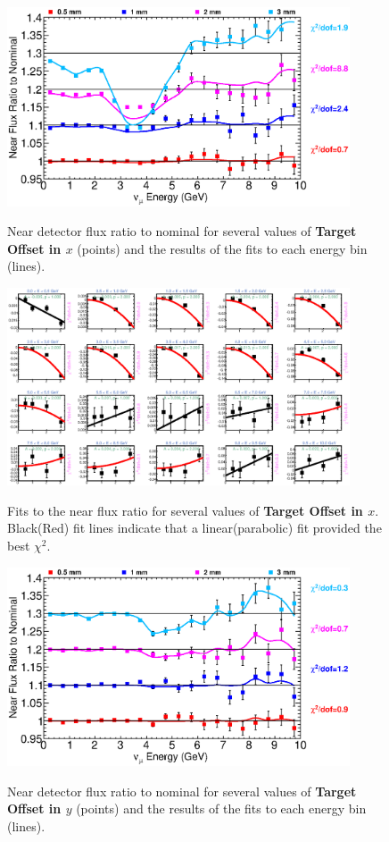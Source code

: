 \begin{figure}[ht]
  \begin{center}
    {\includegraphics[width=4.0in]{figures/TargetXOffset_near_summary.eps}}
  \end{center}
\caption{ Near detector flux ratio to nominal for several values of {\bf Target Offset in $x$} (points) and the results of the fits to each energy bin (lines).}
\end{figure}

\begin{figure}[hb]
  \begin{center}
    {\includegraphics[width=4.0in]{figures/TargetXOffset_near_fits.eps}}
  \end{center}
\caption{ Fits to the near flux ratio for several values of {\bf Target Offset in $x$}. Black(Red) fit lines indicate that a linear(parabolic) fit provided the best $\chi^2$. }
\end{figure}

\begin{figure}[ht]
  \begin{center}
    {\includegraphics[width=4.0in]{figures/TargetYOffset_near_summary.eps}}
  \end{center}
\caption{ Near detector flux ratio to nominal for several values of {\bf Target Offset in $y$} (points) and the results of the fits to each energy bin (lines).}
\end{figure}

